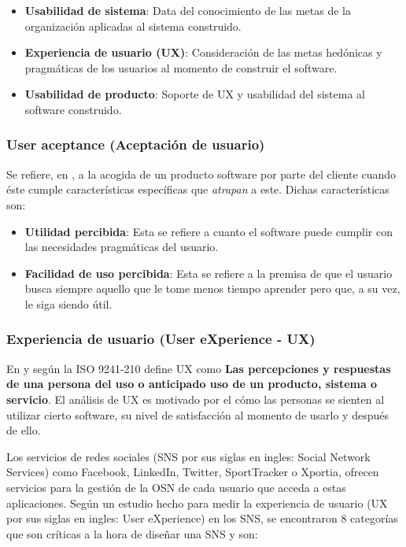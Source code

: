 \begin{itemize}
 \item \textbf{Usabilidad de sistema}: Data del conocimiento de las metas de la organización aplicadas al sistema construido.
\item \textbf{Experiencia de usuario (UX)}: Consideración de las metas hedónicas y pragmáticas de los usuarios al momento de construir el software.
\item \textbf{Usabilidad de producto}: Soporte de UX y usabilidad del sistema al software construido.
\end{itemize}

\subsubsection{User aceptance (Aceptación de usuario)}

Se refiere, en \cite{quality_in_use}, a la acogida de un producto software por parte del cliente cuando éste cumple características específicas que \textit{atrapan} a este. Dichas características son:

\begin{itemize}
 \item \textbf{Utilidad percibida}: Esta se refiere a cuanto el software puede cumplir con las necesidades pragmáticas del usuario.
 \item \textbf{Facilidad de uso percibida}: Esta se refiere a la premisa de que el usuario busca siempre aquello que le tome menos tiempo aprender pero que, a su vez, le siga siendo útil.
\end{itemize}

\subsubsection{Experiencia de usuario (User eXperience - UX)}\label{subsec:UX}

En \cite{quality_in_use} y según la ISO 9241-210 define UX como \textbf{Las percepciones y respuestas de una persona del uso o anticipado uso de un producto, sistema o servicio}. El análisis de UX es motivado por el cómo las personas se sienten al utilizar cierto software, su nivel de satisfacción al momento de usarlo y después de ello.

Los servicios de redes sociales (SNS por sus siglas en ingles: Social Network Services) como Facebook, LinkedIn, Twitter, SportTracker o Xportia, ofrecen servicios para la gestión de la OSN de cada usuario que acceda a estas aplicaciones. Según un estudio hecho para medir la experiencia de usuario \cite{user_behavior_online} (UX por sus siglas en ingles: User eXperience) en los SNS, se encontraron 8 categorías que son críticas a la hora de diseñar una SNS y son:

